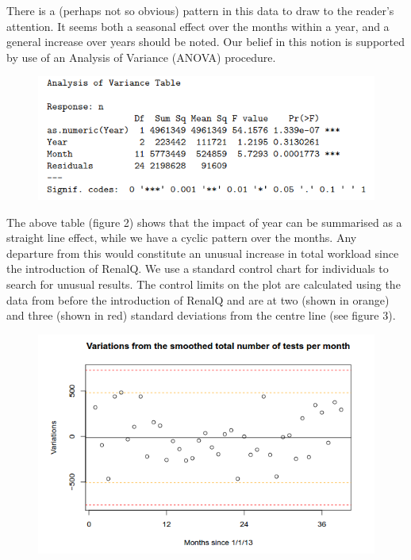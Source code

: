 \documentclass[11pt]{article}
\begin{document}
There is a (perhaps not so obvious) pattern in this data to draw to the reader's attention. It seems both a seasonal effect over the months within a year, and a general increase over years should be noted.  Our belief in this notion is supported by use of an Analysis of Variance (ANOVA) procedure. \\

\begin{figure}[htp]
\centering
\includegraphics[scale=0.50]{fig2.png}
\caption{}
\label{}
\end{figure}

The above table (figure 2) shows that the impact of year can be summarised as a straight line effect, while we have a cyclic pattern over the months. Any departure from this would constitute an unusual increase in total workload since the introduction of RenalQ. We use a standard control chart for individuals to search for unusual results. The control limits on the plot are calculated using the data from before the introduction of RenalQ and are at two (shown in orange) and three (shown in red) standard deviations from the centre line (see figure 3).\\

\begin{figure}[htp]
\centering
\includegraphics[scale=0.50]{fig4.png}
\caption{}
\label{}
\end{figure}
\end{document}

